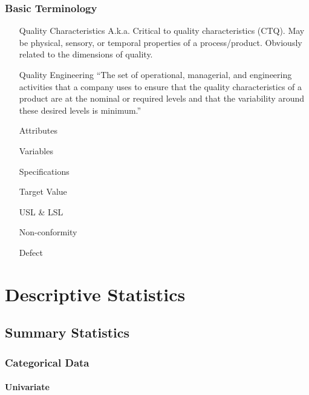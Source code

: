 \documentclass[12pt,a4paper]{report}
\begin{document}
\subsection{Basic Terminology}

\begin{enumerate}
\item [Quality Characteristics] A.k.a. Critical to quality characteristics (CTQ). May be physical, sensory, or temporal properties of a process/product. Obviously related to the dimensions of quality. 

\item [Quality Engineering] ``The set of operational, managerial, and engineering activities
that a company uses to ensure that the quality characteristics of a product are at the nominal
or required levels and that the variability around these desired levels is minimum.'' \citep{montgomery_introduction_2007}

\item [Attributes]

\item [Variables]

\item [Specifications]

\item [Target Value]

\item [USL \& LSL]

\item [Non-conformity]

\item [Defect]

\end{enumerate}





\chapter{Descriptive Statistics}

\section{Summary Statistics}

\subsection{Categorical Data}

\subsubsection{Univariate}
\end{document}
